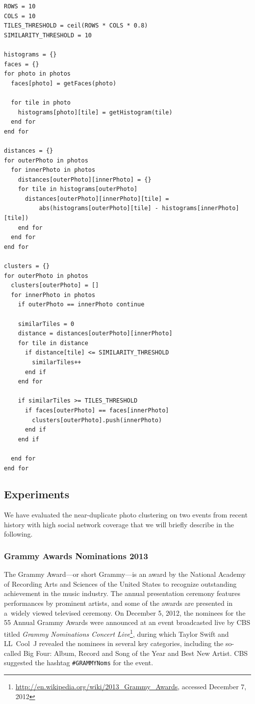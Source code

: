 \begin{lstlisting}[caption={Simplified pseudocode of the near-duplicate
    photo clustering algorithm.},
  label={code:clustering},escapechar=§]
ROWS = 10
COLS = 10
TILES_THRESHOLD = ceil(ROWS * COLS * 0.8)
SIMILARITY_THRESHOLD = 10

histograms = {}
faces = {}
for photo in photos
  faces[photo] = getFaces(photo)

  for tile in photo
    histograms[photo][tile] = getHistogram(tile)
  end for
end for  
    
distances = {}
for outerPhoto in photos
  for innerPhoto in photos
    distances[outerPhoto][innerPhoto] = {}
    for tile in histograms[outerPhoto]
      distances[outerPhoto][innerPhoto][tile] =
          abs(histograms[outerPhoto][tile] - histograms[innerPhoto][tile])
    end for
  end for
end for
  
clusters = {}
for outerPhoto in photos  
  clusters[outerPhoto] = []  
  for innerPhoto in photos
    if outerPhoto == innerPhoto continue
    
    similarTiles = 0
    distance = distances[outerPhoto][innerPhoto]
    for tile in distance      
      if distance[tile] <= SIMILARITY_THRESHOLD
        similarTiles++
      end if   
    end for
         
    if similarTiles >= TILES_THRESHOLD
      if faces[outerPhoto] == faces[innerPhoto]
        clusters[outerPhoto].push(innerPhoto)
      end if
    end if
    
  end for
end for        
\end{lstlisting}

\subsection{Experiments}

We have evaluated the near-duplicate photo clustering
on two events from recent history with high social network coverage
that we will briefly describe in the following.

\subsubsection{Grammy Awards Nominations 2013}

The Grammy Award---or short Grammy---is an award by
the National Academy of Recording Arts and Sciences of the United States
to recognize outstanding achievement in the music industry.
The annual presentation ceremony features performances by prominent artists,
and some of the awards are presented in a~widely viewed televised ceremony.
On December 5, 2012, the nominees for the 55 Annual Grammy Awards
were announced at an event broadcasted live by CBS
titled \emph{Grammy Nominations Concert
Live}\footnote{\url{http://en.wikipedia.org/wiki/2013_Grammy_Awards},
accessed December 7, 2012},
during which Taylor Swift and LL~Cool~J revealed the nominees in several key categories, including the so-called Big Four: Album, Record and Song of the Year and Best New Artist.
CBS suggested the hashtag \texttt{\#GRAMMYNoms} for the event.

